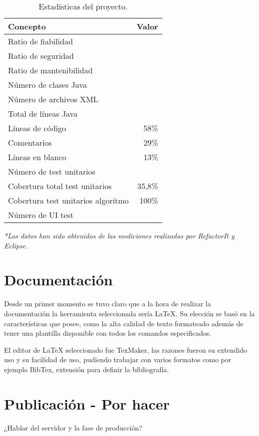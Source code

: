 \begin{table}
\centering
\begin{tabular}{lr}
\toprule
\textbf{Concepto}                  & \multicolumn{1}{r}{\textbf{Valor}} \\ 
\midrule
Ratio de fiabilidad                &          												\\
Ratio de seguridad                 & 																	\\
Ratio de mantenibilidad						 & 																  \\ 
\midrule
Número de clases Java              &                                 \\
Número de archivos XML             &                               \\
\midrule
Total de líneas Java               &                              \\
Líneas de código                   & 58\%            				            \\
Comentarios                        & 29\%          			                \\
Líneas en blanco                   & 13\%    		                        \\
\midrule
Número de test unitarios           & 																\\
Cobertura total test unitarios     & 35,8\%                             \\
Cobertura test unitarios algoritmo & 100\%                              \\
Número de UI test                  & 																\\ 
\bottomrule
\end{tabular}
\caption{Estadísticas del proyecto.}
\label{stats}
\end{table}

\emph{*Los datos han sido obtenidos de las mediciones realizadas por RefactorIt y Eclipse.}

\section{Documentación}

Desde un primer momento se tuvo claro que a la hora de realizar la documentación la herramienta seleccionada sería LaTeX. Su elección se basó en la características que posee, como la alta calidad de texto formateado además de tener una plantilla disponible con todos los comandos especificados.

El editor de LaTeX seleccionado fue TexMaker, las razones fueron su extendido uso y su facilidad de uso, pudiendo trabajar con varios formatos como por ejemplo BibTex, extensión para definir la bibliografía.

\section{Publicación - Por hacer}

¿Hablar del servidor y la fase de producción?